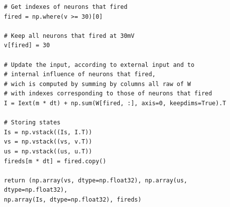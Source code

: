 \documentclass[12pt]{scrartcl}
\begin{document}
\begin{lstlisting}[caption = {Numpy vs Tensorflow : Implémentation Numpy}]
# Get indexes of neurons that fired
fired = np.where(v >= 30)[0]

# Keep all neurons that fired at 30mV
v[fired] = 30

# Update the input, according to external input and to
# internal influence of neurons that fired, 
# wich is computed by summing by columns all raw of W
# with indexes corresponding to those of neurons that fired
I = Iext(m * dt) + np.sum(W[fired, :], axis=0, keepdims=True).T

# Storing states
Is = np.vstack((Is, I.T))
vs = np.vstack((vs, v.T))
us = np.vstack((us, u.T))
fireds[m * dt] = fired.copy()

return (np.array(vs, dtype=np.float32), np.array(us, dtype=np.float32),
np.array(Is, dtype=np.float32), fireds)
\end{lstlisting}
\end{document}
